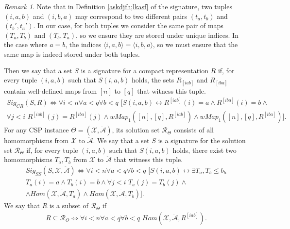 \documentclass{article}
\theoremstyle{definition}
\theoremstyle{theorem}
\theoremstyle{theorem}
\theoremstyle{remark}
\theoremstyle{remark}
\newtheorem{rem}{Remark}
\theoremstyle{example}
\theoremstyle{notation}
\theoremstyle{theorem}
\begin{document}
\begin{rem}\label{a=++++}
Note that in Definition \ref{askdjfh;lkasf} of the signature, two tuples $(i,a,b)$ and $(i,b,a)$ may correspond to two different pairs $(t_a,t_b)$ and $(t_b',t_a')$. In our case, for both tuples we consider the same pair of maps $(T_a, T_b)$ and $(T_b, T_a)$, so we ensure they are stored under unique indices. In the case where $a=b$, the indices $\langle i,a,b\rangle = \langle i,b,a\rangle$, so we must ensure that the same map is indeed stored under both tuples.
\end{rem}
Then we say that a set $S$ is a signature for a compact representation $R$ if, for every tuple $(i,a,b)$ such that $S(i,a,b)$ holds, the sets $R_{[iab]}$ and $R_{[iba]}$ contain well-defined maps from $[n]$ to $[q]$ that witness this tuple.
\begin{equation}\label{eq1232346}
\begin{gathered}
    Sig_{CR}(S, R) \iff \forall i<n\forall a<q\forall b<q\,\, \big[ S(i,a,b)\longleftrightarrow
R^{[iab]}(i)=a \wedge R^{[iba]}(i)=b \wedge \\
\forall j<i\,\,R^{[iab]}(j) = R^{[iba]}(j)\wedge wMap_1([n], [q], R^{[iab]})\wedge wMap_1([n], [q], R^{[iba]})\big].
\end{gathered}
\end{equation}
For any CSP instance $\Theta=(\mathcal{X},\ddot{\mathcal{A}})$, its solution set $\mathscr{R}_{\Theta}$ consists of all homomorphisms from $\mathcal{X}$ to $\ddot{\mathcal{A}}$. We say that a set $S$ is a signature for the solution set $\mathscr{R}_{\Theta}$ if, for every tuple $(i,a,b)$ such that $S(i,a,b)$ holds, there exist two homomorphisms $T_a, T_b$ from $\mathcal{X}$ to $\ddot{\mathcal{A}}$ that witness this tuple.
\begin{equation}\label{eqj3jkr}
\begin{gathered}
   Sig_{SS}(S, \mathcal{X},\ddot{\mathcal{A}}) \iff \forall i<n\forall a<q\forall b<q\,\, \big[S(i,a,b)\longleftrightarrow
    \exists T_a,T_b\leq b_h\\
T_a(i)=a \wedge T_b(i)=b \wedge \forall j<i\,\, T_a(j) = T_b(j)\wedge \\
\wedge Hom(\mathcal{X},\ddot{\mathcal{A}}, T_a)\wedge Hom(\mathcal{X},\ddot{\mathcal{A}}, T_b)\big].
\end{gathered}
\end{equation}
We say that $R$ is a subset of $\mathscr{R}_{\Theta}$ if
\begin{equation}
    \begin{gathered}
        R\subseteq \mathscr{R}_{\Theta} \iff \forall i<n\forall a<q\forall b<q \,\, Hom(\mathcal{X},\ddot{\mathcal{A}}, R^{[iab]}).
    \end{gathered}
\end{equation}
\end{document}

